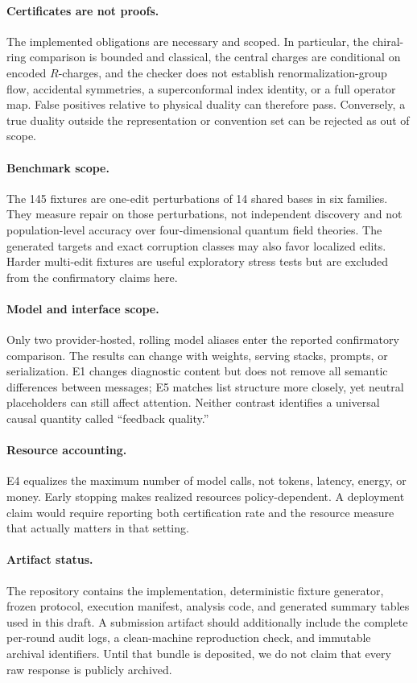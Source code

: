 \documentclass[11pt]{scrartcl}
\begin{document}
\paragraph{Certificates are not proofs.}
The implemented obligations are necessary and scoped.  In particular, the
chiral-ring comparison is bounded and classical, the central charges are
conditional on encoded $R$-charges, and the checker does not establish
renormalization-group flow, accidental symmetries, a superconformal index
identity, or a full operator map.  False positives relative to physical duality
can therefore pass.  Conversely, a true duality outside the representation or
convention set can be rejected as out of scope.

\paragraph{Benchmark scope.}
The 145 fixtures are one-edit perturbations of 14 shared bases in six families.
They measure repair on those perturbations, not independent discovery and not
population-level accuracy over four-dimensional quantum field theories.  The
generated targets and exact corruption classes may also favor localized edits.
Harder multi-edit fixtures are useful exploratory stress tests but are excluded
from the confirmatory claims here.

\paragraph{Model and interface scope.}
Only two provider-hosted, rolling model aliases enter the reported confirmatory
comparison.  The results can change with weights, serving stacks, prompts, or
serialization.  E1 changes diagnostic content but does not remove all semantic
differences between messages; E5 matches list structure more closely, yet
neutral placeholders can still affect attention.  Neither contrast identifies
a universal causal quantity called ``feedback quality.''

\paragraph{Resource accounting.}
E4 equalizes the maximum number of model calls, not tokens, latency, energy, or
money.  Early stopping makes realized resources policy-dependent.  A deployment
claim would require reporting both certification rate and the resource measure
that actually matters in that setting.

\paragraph{Artifact status.}
The repository contains the implementation, deterministic fixture generator,
frozen protocol, execution manifest, analysis code, and generated summary
tables used in this draft.  A submission artifact should additionally include
the complete per-round audit logs, a clean-machine reproduction check, and
immutable archival identifiers.  Until that bundle is deposited, we do not
claim that every raw response is publicly archived.
\end{document}
